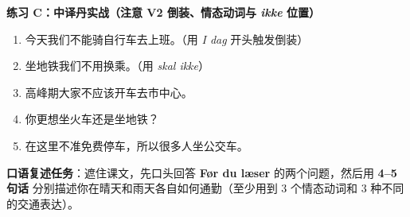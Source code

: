 \textbf{练习 C：中译丹实战（注意 V2 倒装、情态动词与 \textit{ikke} 位置）}
\begin{enumerate}
  \item 今天我们不能骑自行车去上班。（用 \textit{I dag} 开头触发倒装）
  \item 坐地铁我们不用换乘。（用 \textit{skal ikke}）
  \item 高峰期大家不应该开车去市中心。
  \item 你更想坐火车还是坐地铁？
  \item 在这里不准免费停车，所以很多人坐公交车。
\end{enumerate}


\textbf{口语复述任务}：遮住课文，先口头回答 \textbf{Før du læser} 的两个问题，然后用 \textbf{4--5 句话} 分别描述你在晴天和雨天各自如何通勤（至少用到 3 个情态动词和 3 种不同的交通表达）。


